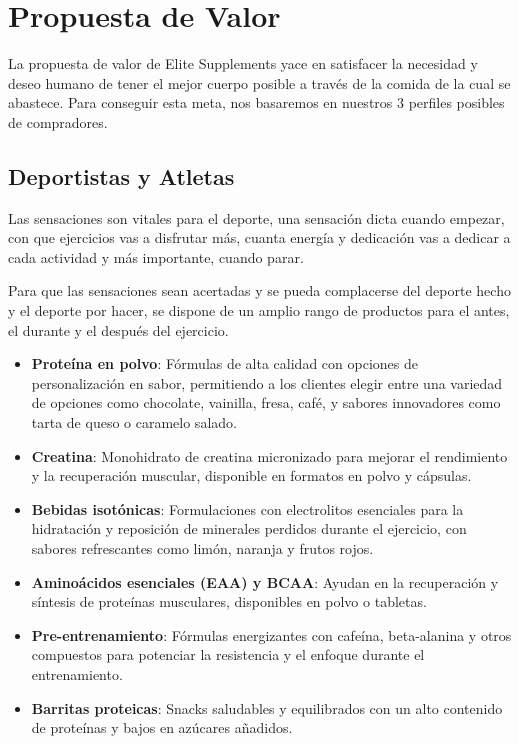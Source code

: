 \documentclass[11pt,a4paper]{report}
\begin{document}

\newpage

\section{Propuesta de Valor}
La propuesta de valor de Elite Supplements yace en satisfacer la necesidad y deseo humano de tener el mejor cuerpo posible a través de la comida de la cual se abastece. Para conseguir esta meta, nos basaremos en nuestros 3 perfiles posibles de compradores.

\subsection{Deportistas y Atletas}
Las sensaciones son vitales para el deporte, una sensación dicta cuando empezar, con que ejercicios vas a disfrutar más, cuanta energía y dedicación vas a dedicar a cada actividad y más importante, cuando parar.

Para que las sensaciones sean acertadas y se pueda complacerse del deporte hecho y el deporte por hacer, se dispone de un amplio rango de productos para el antes, el durante y el después del ejercicio.

\begin{itemize}
    \item \textbf{Proteína en polvo}: Fórmulas de alta calidad con opciones de personalización en sabor, permitiendo a los clientes elegir entre una variedad de opciones como chocolate, vainilla, fresa, café, y sabores innovadores como tarta de queso o caramelo salado.
    \item \textbf{Creatina}: Monohidrato de creatina micronizado para mejorar el rendimiento y la recuperación muscular, disponible en formatos en polvo y cápsulas.
    \item \textbf{Bebidas isotónicas}: Formulaciones con electrolitos esenciales para la hidratación y reposición de minerales perdidos durante el ejercicio, con sabores refrescantes como limón, naranja y frutos rojos.
    \item \textbf{Aminoácidos esenciales (EAA) y BCAA}: Ayudan en la recuperación y síntesis de proteínas musculares, disponibles en polvo o tabletas.
    \item \textbf{Pre-entrenamiento}: Fórmulas energizantes con cafeína, beta-alanina y otros compuestos para potenciar la resistencia y el enfoque durante el entrenamiento.
    \item \textbf{Barritas proteicas}: Snacks saludables y equilibrados con un alto contenido de proteínas y bajos en azúcares añadidos.
\end{itemize}
\end{document}
